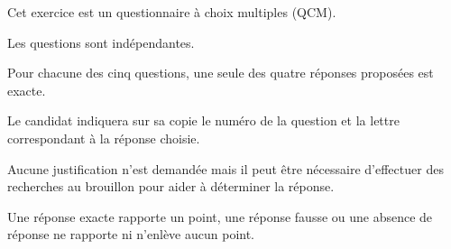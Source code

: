 \medskip

Cet exercice est un questionnaire à choix multiples (QCM). 

Les  questions sont indépendantes.

Pour chacune des cinq questions, une seule des quatre réponses proposées est exacte.

Le candidat indiquera sur sa copie le numéro de la question et la lettre correspondant à la
réponse choisie.

Aucune justification n’est demandée mais il peut être nécessaire d’effectuer des recherches
au brouillon pour aider à déterminer la réponse.

Une réponse exacte rapporte un point, une réponse fausse ou une absence de réponse ne rapporte ni n’enlève aucun point.

\medskip

